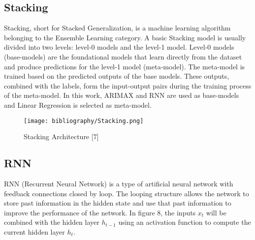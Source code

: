\documentclass{ieeeojies}
\begin{document}
\subsection{Stacking}

Stacking, short for Stacked Generalization, is a machine learning algorithm belonging to the Ensemble Learning category. A basic Stacking model is usually divided into two levels: level-0 models and the level-1 model. Level-0 models (base-models) are the foundational models that learn directly from the dataset and produce predictions for the level-1 model (meta-model). The meta-model is trained based on the predicted outputs of the base models. These outputs, combined with the labels, form the input-output pairs during the training process of the meta-model. In this work, ARIMAX and RNN are used as base-models and Linear Regression is selected as meta-model.  
\begin{figure}[H]
  \centering
  \begin{minipage}{0.9\linewidth}
    \centering
    \texttt{[image: bibliography/Stacking.png]}
    \caption{Stacking Architecture [7]}
    \label{fig8}
  \end{minipage}
\end{figure}

\subsection{RNN}
RNN (Recurrent Neural Network) is a type of artificial neural network with feedback connections closed by loop. The looping structure allows the network to store past information in the hidden state and use that past information to improve the performance of the network. In figure 8, the inputs \( x_t \) will be combined with the hidden layer \( h_{t-1} \) using an activation function to compute the current hidden layer \( h_t \).
\end{document}
